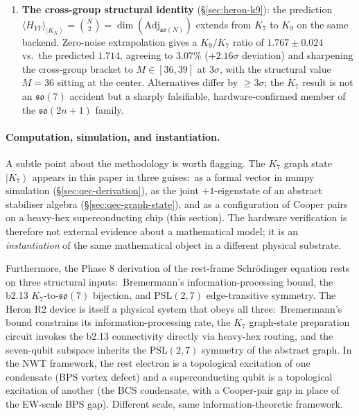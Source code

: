 \documentclass[11pt]{article}
\newcommand{\so}{\mathfrak{so}}
\newcommand{\Adj}{\mathrm{Adj}}
\newcommand{\ket}[1]{\left|#1\right\rangle}
\newcommand{\PSL}{\mathrm{PSL}}
\begin{document}
\begin{enumerate}
  against edge-equality), yet the bulk
  $\langle H_{YY}\rangle$ identity converges within
  $\sim 25\%$ across all three runs.  The $\PSL(2,7)$
  symmetry of $\ket{K_7}$ is what makes this possible:\ the
  framework's predictions are sums over the internal symmetry
  orbit, so a hardware noise channel that locally breaks the
  symmetry is compatible with bulk faithfulness.  This is the
  precise sense in which the chip realises the structure---on
  average over the symmetry group, not edge-by-edge.
\item \textbf{The cross-group structural identity}
  (\S\ref{sec:heron-k9}):  the prediction
  $\langle H_{YY}\rangle_{\ket{K_N}} = \binom{N}{2} =
  \dim(\Adj_{\so(N)})$ extends from $K_7$ to $K_9$ on the same
  backend.  Zero-noise extrapolation gives a $K_9/K_7$ ratio of
  $1.767 \pm 0.024$ vs.\ the predicted $1.714$, agreeing to $3.07\%$
  ($+2.16\sigma$ deviation) and sharpening the cross-group bracket
  to $M \in [36, 39]$ at $3\sigma$, with the structural value
  $M = 36$ sitting at the center.  Alternatives differ by
  $\geq 3\sigma$; the $K_7$ result is not an $\so(7)$ accident but
  a sharply falsifiable, hardware-confirmed member of the
  $\so(2n+1)$ family.
\end{enumerate}

\paragraph{Computation, simulation, and instantiation.}
A subtle point about the methodology is worth flagging.  The $K_7$
graph state $\ket{K_7}$ appears in this paper in three guises:\
as a formal vector in numpy simulation (\S\ref{sec:qec-derivation}),
as the joint $+1$-eigenstate of an abstract stabiliser algebra
(\S\ref{sec:qec-graph-state}), and as a configuration of Cooper
pairs on a heavy-hex superconducting chip (this section).  The
hardware verification is therefore not external evidence about a
mathematical model; it is an \emph{instantiation} of the same
mathematical object in a different physical substrate.

Furthermore, the Phase 8 derivation of the rest-frame Schr\"odinger
equation rests on three structural inputs:\ Bremermann's
information-processing bound, the b2.13 $K_7$-to-$\so(7)$ bijection,
and $\PSL(2,7)$ edge-transitive symmetry.  The Heron R2 device is
itself a physical system that obeys all three:\ Bremermann's bound
constrains its information-processing rate, the $K_7$ graph-state
preparation circuit invokes the b2.13 connectivity directly via
heavy-hex routing, and the seven-qubit subspace inherits the
$\PSL(2,7)$ symmetry of the abstract graph.  In the NWT framework,
the rest electron is a topological excitation of one condensate
(BPS vortex defect) and a superconducting qubit is a topological
excitation of another (the BCS condensate, with a Cooper-pair gap
in place of the EW-scale BPS gap).  Different scale, same
information-theoretic framework.
\end{document}
